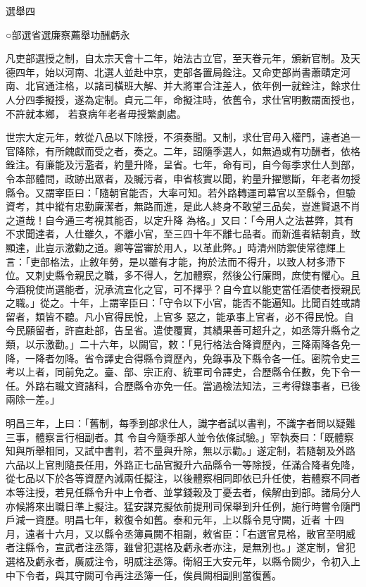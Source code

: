 
\begin{pinyinscope}

 選舉四



 ○部選省選廉察薦舉功酬虧永



 凡吏部選授之制，自太宗天會十二年，始法古立官，至天眷元年，頒新官制。及天德四年，始以河南、北選人並赴中京，吏部各置局銓注。又命吏部尚書蕭賾定河南、北官通注格，以諸司橫班大解、并大將軍合注差人，依年例一就銓注，餘求仕人分四季擬授，遂為定制。貞元二年，命擬注時，依舊令，求仕官明數謂面授也，不許就本鄉，
 若衰病年老者毋授繁劇處。



 世宗大定元年，敕從八品以下除授，不須奏聞。又制，求仕官毋入權門，違者追一官降除，有所餽獻而受之者，奏之。二年，詔隨季選人，如無過或有功酬者，依格銓注。有廉能及污濫者，約量升降，呈省。七年，命有司，自今每季求仕人到部，令本部體問，政跡出眾者，及贓污者，申省核實以聞，約量升擢懲斷，年老者勿授縣令。又謂宰臣曰：「隨朝官能否，大率可知。若外路轉運司幕官以至縣令，但驗資考，其中縱有忠勤廉潔者，無路而進，是此人終身不敢望三品矣，豈進賢退不肖之道哉！自今通三考視其能否，以定升降
 為格。」又曰：「今用人之法甚弊，其有不求聞達者，人仕雖久，不離小官，至三四十年不離七品者。而新進者結朝貴，致顯達，此豈示激勸之道。卿等當審於用人，以革此弊。」時清州防禦使常德輝上言：「吏部格法，止敘年勞，是以雖有才能，拘於法而不得升，以致人材多滯下位。又刺史縣令親民之職，多不得人，乞加體察，然後公行廉問，庶使有懼心。且今酒稅使尚選能者，況承流宣化之官，可不擇乎？自今宜以能吏當任酒使者授親民之職。」從之。十年，上謂宰臣曰：「守令以下小官，能否不能遍知。比聞百姓或請留者，類皆不聽。凡小官得民悅，上官多
 惡之，能承事上官者，必不得民悅。自今民願留者，許直赴部，告呈省。遣使覆實，其績果善可超升之，如丞簿升縣令之類，以示激勸。」二十六年，以闕官，敕：「見行格法合降資歷內，三降兩降各免一降，一降者勿降。省令譯史合得縣令資歷內，免錄事及下縣令各一任。密院令史三考以上者，同前免之。臺、部、宗正府、統軍司令譯史，合歷縣令任數，免下令一任。外路右職文資諸科，合歷縣令亦免一任。當過檢法知法，三考得錄事者，已後兩除一差。」



 明昌三年，上曰：「舊制，每季到部求仕人，識字者試以書判，不識字者問以疑難三事，體察言行相副者。其
 令自今隨季部人並令依條試驗。」宰執奏曰：「既體察知與所舉相同，又試中書判，若不量與升除，無以示勸。」遂定制，若隨朝及外路六品以上官則隨長任用，外路正七品官擬升六品縣令一等除授，任滿合降者免降，從七品以下於各等資歷內減兩任擬注，以後體察相同即依已升任使，若體察不同者本等注授，若見任縣令升中上令者、並掌錢穀及丁憂去者，候解由到部。諸局分人亦候將來出職日準上擬注。猛安謀克擬依前提刑司保舉到升任例，施行時嘗令隨門戶減一資歷。明昌七年，敕復令如舊。泰和元年，上以縣令見守闕，近者
 十四月，遠者十六月，又以縣令丞簿員闕不相副，敕省臣：「右選官見格，散官至明威者注縣令，宣武者注丞簿，雖曾犯選格及虧永者亦注，是無別也。」遂定制，曾犯選格及虧永者，廣威注令，明威注丞簿。衛紹王大安元年，以縣令闕少，令初入上中下令者，與其守闕可令再注丞簿一任，俟員闕相副則當復舊。




\end{pinyinscope}
